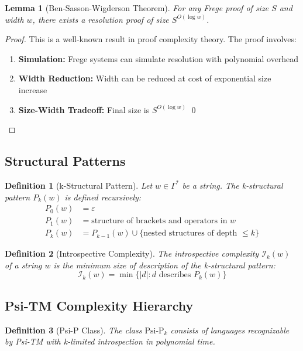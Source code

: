 \documentclass[11pt]{article}
\newtheorem{definition}{Definition}
\newtheorem{lemma}{Lemma}
\begin{document}
\begin{lemma}[Ben-Sasson-Wigderson Theorem]
For any Frege proof of size $S$ and width $w$, there exists a resolution proof of size $S^{O(\log w)}$.
\end{lemma}

\begin{proof}
This is a well-known result in proof complexity theory. The proof involves:
\begin{enumerate}
\item \textbf{Simulation:} Frege systems can simulate resolution with polynomial overhead
\item \textbf{Width Reduction:} Width can be reduced at cost of exponential size increase
\item \textbf{Size-Width Tradeoff:} Final size is $S^{O(\log w)}$ \qed
\end{enumerate}
\end{proof}

\subsection{Structural Patterns}

\begin{definition}[k-Structural Pattern]
Let $w \in \Gamma^*$ be a string. The k-structural pattern $P_k(w)$ is defined recursively:
\begin{align*}
P_0(w) &= \varepsilon \\
P_1(w) &= \text{structure of brackets and operators in } w \\
P_k(w) &= P_{k-1}(w) \cup \{\text{nested structures of depth } \leq k\}
\end{align*}
\end{definition}

\begin{definition}[Introspective Complexity]
The introspective complexity $\mathcal{I}_k(w)$ of a string $w$ is the minimum size of description of the k-structural pattern:
$$\mathcal{I}_k(w) = \min\{|d| : d \text{ describes } P_k(w)\}$$
\end{definition}

\subsection{Psi-TM Complexity Hierarchy}

\begin{definition}[Psi-P Class]
The class $\text{Psi-P}_k$ consists of languages recognizable by Psi-TM with k-limited introspection in polynomial time.
\end{definition}
\end{document}
